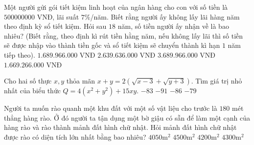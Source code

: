 \begin{ex}%
Một người gửi gói tiết kiệm linh hoạt của ngân hàng cho con với số tiền là $500000000$ VNĐ, lãi suất $7\%$/năm. Biết rằng người ấy không lấy lãi hàng năm theo định  kỳ sổ tiết kiệm. Hỏi sau $18$ năm, số tiền người ấy nhận về là bao nhiêu? (Biết rằng, theo định kì rút tiền hằng năm, nếu không lấy lãi thì số tiền sẽ được nhập  vào thành tiền gốc và sổ tiết kiệm sẽ chuyển thành kì hạn $1$ năm tiếp theo). 
\choice
{\True $1.689.966.000$ VNĐ}
{$2.639.636.000$ VNĐ}
{$3.689.966.000$ VNĐ}
{$1.669.266.000$ VNĐ}
\end{ex}

\begin{ex}%
Cho hai số thực $x,y$ thỏa mãn $x+y = 2\left(\sqrt{x-3}+\sqrt{y+3}\right)$. Tìm giá trị nhỏ nhất của biểu thức $Q = 4(x^2+y^2)+15xy$.
\choice
{\True $-83$}
{$-91$}
{$-86$}
{$-79$}
\end{ex}


\begin{ex}%
Người ta muốn rào quanh một khu đất với một số vật liệu cho trước là  $180$ 
mét thẳng hàng rào. Ở đó người ta tận dụng một bờ giậu có sẵn để làm một cạnh của 
hàng rào và rào thành mảnh đất hình chữ nhật. Hỏi mảnh đất hình chữ nhật được rào 
có diện tích lớn nhất bằng bao nhiêu?
\choice
{\True $4050$m$^2$}
{ $4500$m$^2$}
{ $4200$m$^2$}
{ $4300$m$^2$}
\end{ex}


